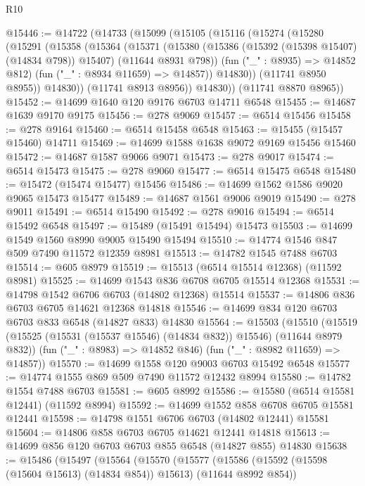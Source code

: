 \begin{lexlean}{R10}
\begin{coremodule}
{{{{{{{{{{{{{{{{{{{{{{{{{{{{{{{{{{{{{{{{{{{{{{{{{{{{{{{{{{{{{{{{{{{{{{{{{{{{{{{{{{{{@15446 := @14722
    (@14733
      (@15099
        (@15105
          (@15116
            (@15274
              (@15280
                (@15291
                  (@15358
                    (@15364
                      (@15371
                        (@15380
                          (@15386 (@15392 (@15398 @15407) (@14834 @798)) @15407)
                          (@11644 @8931 @798))
                        (fun ("_" : @8935) => @14852 @812)
                        (fun ("_" : @8934 @11659) => @14857))
                      @14830))
                  (@11741 @8950 @8955))
                @14830))
            (@11741 @8913 @8956))
          @14830))
      (@11741 @8870 @8965))
@15452 := @14699 @1640 @120 @9176 @6703 @14711 @6548
@15455 := @14687 @1639 @9170 @9175
@15456 := @278 @9069
@15457 := @6514 @15456
@15458 := @278 @9164
@15460 := @6514 @15458 @6548
@15463 := @15455 (@15457 @15460) @14711
@15469 := @14699 @1588 @1638 @9072 @9169 @15456 @15460
@15472 := @14687 @1587 @9066 @9071
@15473 := @278 @9017
@15474 := @6514 @15473
@15475 := @278 @9060
@15477 := @6514 @15475 @6548
@15480 := @15472 (@15474 @15477) @15456
@15486 := @14699 @1562 @1586 @9020 @9065 @15473 @15477
@15489 := @14687 @1561 @9006 @9019
@15490 := @278 @9011
@15491 := @6514 @15490
@15492 := @278 @9016
@15494 := @6514 @15492 @6548
@15497 := @15489 (@15491 @15494) @15473
@15503 := @14699 @1549 @1560 @8990 @9005 @15490 @15494
@15510 := @14774 @1546 @847 @509 @7490 @11572 @12359 @8981
@15513 := @14782 @1545 @7488 @6703
@15514 := @605 @8979
@15519 := @15513 (@6514 @15514 @12368) (@11592 @8981)
@15525 := @14699 @1543 @836 @6708 @6705 @15514 @12368
@15531 := @14798 @1542 @6706 @6703 (@14802 @12368) @15514
@15537 := @14806 @836 @6703 @6705 @14621 @12368 @14818
@15546 := @14699 @834 @120 @6703 @6703 @833 @6548 (@14827 @833) @14830
@15564 := @15503
    (@15510
      (@15519 (@15525 (@15531 (@15537 @15546) (@14834 @832)) @15546) (@11644 @8979 @832))
      (fun ("_" : @8983) => @14852 @846)
      (fun ("_" : @8982 @11659) => @14857))
@15570 := @14699 @1558 @120 @9003 @6703 @15492 @6548
@15577 := @14774 @1555 @869 @509 @7490 @11572 @12432 @8994
@15580 := @14782 @1554 @7488 @6703
@15581 := @605 @8992
@15586 := @15580 (@6514 @15581 @12441) (@11592 @8994)
@15592 := @14699 @1552 @858 @6708 @6705 @15581 @12441
@15598 := @14798 @1551 @6706 @6703 (@14802 @12441) @15581
@15604 := @14806 @858 @6703 @6705 @14621 @12441 @14818
@15613 := @14699 @856 @120 @6703 @6703 @855 @6548 (@14827 @855) @14830
@15638 := @15486
    (@15497
      (@15564
        (@15570
          (@15577
            (@15586 (@15592 (@15598 (@15604 @15613) (@14834 @854)) @15613) (@11644 @8992 @854))
}}}}}}}}}}}}}}}}}}}}}}}}}}}}}}}}}}}}}}}}}}}}}}}}}}}}}}}}}}}}}}}}}}}}}}}}}}}}}}}}}}}}
\end{coremodule}
\end{lexlean}
